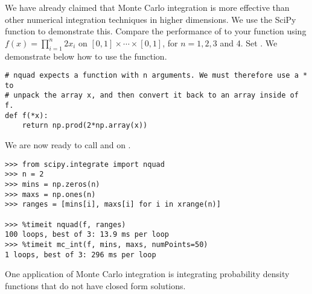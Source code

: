 \begin{problem}
We have already claimed that Monte Carlo integration is more effective than other numerical integration techniques in higher dimensions. We use the SciPy function  to demonstrate this. Compare the performance of  to your  function using $f(x)=\prod_{i=1}^{n} 2x_i$ on $[0,1]\times \dotsb \times [0,1]$, for $n=1,2,3$ and 4. Set . We demonstrate below how to use the  function.

\begin{lstlisting}
# nquad expects a function with n arguments. We must therefore use a * to
# unpack the array x, and then convert it back to an array inside of f.
def f(*x):
    return np.prod(2*np.array(x))
\end{lstlisting}

We are now ready to call  and  on .

\begin{lstlisting}
>>> from scipy.integrate import nquad
>>> n = 2
>>> mins = np.zeros(n)
>>> maxs = np.ones(n)
>>> ranges = [mins[i], maxs[i] for i in xrange(n)]

>>> %timeit nquad(f, ranges)
100 loops, best of 3: 13.9 ms per loop
>>> %timeit mc_int(f, mins, maxs, numPoints=50)
1 loops, best of 3: 296 ms per loop

\end{lstlisting}
\end{problem}

\begin{comment}
\begin{problem}
\label{prob:mc_test}
The exact value of the integral of
\[
f(w,x,y,z) = sin(x) y^5 -y^3 + zw + yz^3
\]
on $[-1,1]x[-1,1]x[-1,1]x[-1,1]$ is 0.
\begin{enumerate}
\item Run the function \li{mc_int()} you wrote in Problem \ref{prob:mc} on $f$ 10 sample points.
Do this 100 times and take the average. What is the error?
\item Repeat part (1) of this problem with 100, 1000, and 10000 sample points. 
Plot the errors of your estimates.
\end{enumerate}
\end{problem}
\end{comment}

One application of Monte Carlo integration is integrating probability density functions that do not have closed form solutions.

